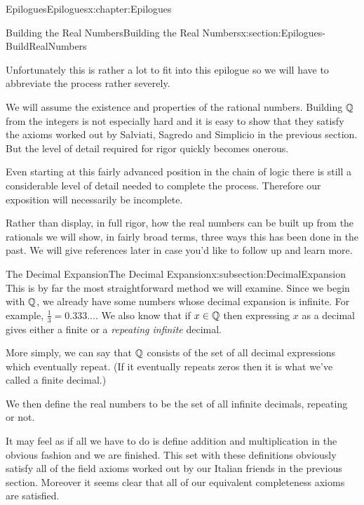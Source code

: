 \begin{chapterptx}{Epilogues}{}{Epilogues}{}{}{x:chapter:Epilogues}
\begin{sectionptx}{Building the Real Numbers}{}{Building the Real Numbers}{}{}{x:section:Epilogues-BuildRealNumbers}
\begin{introduction}{}
			\par
			Unfortunately this is rather a lot to fit into this epilogue so we will have to abbreviate the process rather severely.%
			\par
			We will assume the existence and properties of the rational numbers.  Building \(\mathbb {Q}\) from the integers is not especially hard and it is easy to show that they satisfy the axioms worked out by Salviati, Sagredo and Simplicio in the previous section.  But the level of detail required for rigor quickly becomes onerous.%
			\par
			Even starting at this fairly advanced position in the chain of logic there is still a considerable level of detail needed to complete the process. Therefore our exposition will necessarily be incomplete.%
			\par
			Rather than display, in full rigor, how the real numbers can be built up from the rationals we will show, in fairly broad terms, three ways this has been done in the past. We will give references later in case you'd like to follow up and learn more.%
		\end{introduction}%
		\typeout{************************************************}
		\typeout{************************************************}
		\begin{subsectionptx}{The Decimal Expansion}{}{The Decimal Expansion}{}{}{x:subsection:DecimalExpansion}
			This is by far the most straightforward method we will examine. Since we begin with \(\mathbb {Q}\), we already have some numbers whose decimal expansion is infinite. For example, \(\frac13= 0.333\ldots\). We also know that if \(x\in\mathbb {Q}\) then expressing \(x\) as a decimal gives either a finite or a \emph{repeating infinite} decimal.%
			\par
			More simply, we can say that \(\mathbb {Q}\) consists of the set of all decimal expressions which eventually repeat. (If it eventually repeats zeros then it is what we've called a finite decimal.)%
			\par
			We then define the real numbers to be the set of all infinite decimals, repeating or not.%
			\par
			It may feel as if all we have to do is define addition and multiplication in the obvious fashion and we are finished. This set with these definitions obviously satisfy all of the field axioms worked out by our Italian friends in the previous section. Moreover it seems clear that all of our equivalent completeness axioms are satisfied.%

\end{subsectionptx}
\end{sectionptx}
\end{chapterptx}
